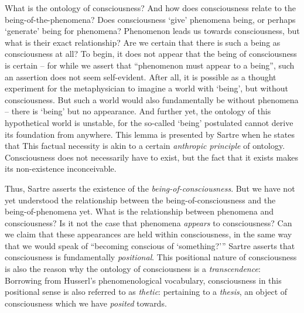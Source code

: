 
What is the ontology of consciousness? And how does consciousness relate to the being-of-the-phenomena? Does consciousness \enquote*{give} phenomena being, or perhaps \enquote*{generate} being for phenomena? Phenomenon leads us towards consciousness, but what is their exact relationship? Are we certain that there is such a being as consciousness at all? To begin, it does not appear that the being of consciousness is certain -- for while we assert that \enquote{phenomenon must appear to a being}, such an assertion does not seem self-evident. After all, it is possible as a thought experiment for the metaphysician to imagine a world with \enquote*{being}, but without consciousness. But such a world would also fundamentally be without phenomena -- there is \enquote*{being} but no appearance. And further yet, the ontology of this hypothetical world is unstable, for the so-called \enquote*{being} postulated cannot derive its foundation from anywhere. This lemma is presented by Sartre when he states that  This factual necessity is akin to a certain \emph{anthropic principle} of ontology. Consciousness does not necessarily have to exist, but the fact that it exists makes its non-existence inconceivable.

Thus, Sartre asserts the existence of the \emph{being-of-consciousness}. But we have not yet understood the relationship between the being-of-consciousness and the being-of-phenomena yet. What is the relationship between phenomena and consciousness? Is it not the case that phenomena \emph{appears} to consciousness? Can we claim that these appearances are held within consciousness, in the same way that we would speak of \enquote{becoming conscious of \enquote{something?}} Sartre asserts that consciousness is fundamentally \emph{positional}.   This positional nature of consciousness is also the reason why the ontology of consciousness is a \emph{transcendence}:  Borrowing from Husserl's phenomenological vocabulary, consciousness in this positional sense is also referred to as \emph{thetic}: pertaining to a \emph{thesis}, an object of consciousness which we have \emph{posited} towards.

